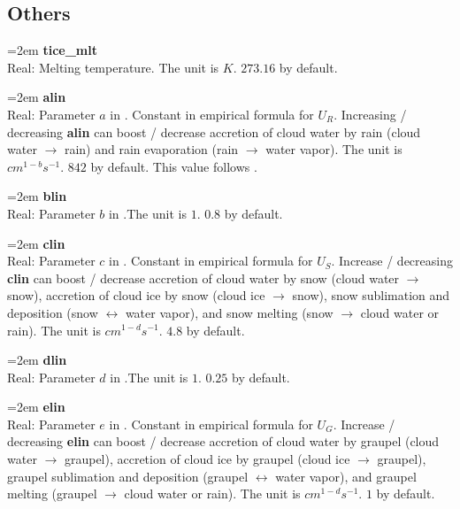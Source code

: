 \documentclass[letterpaper,titlepage,10pt]{article}
\numberwithin{equation}{section}
\begin{document}
\begin{appendices}

\subsection{Others}

\hangindent=2em
\textbf{tice\_mlt}\\ Real: Melting temperature. The unit is $K$. $273.16$ by default.

\hangindent=2em
\textbf{alin}\\ Real: Parameter $a$ in \citet{lin1983bulk}. Constant in empirical formula for $U_R$. Increasing / decreasing \textbf{alin} can boost / decrease accretion of cloud water by rain (cloud water $\rightarrow$ rain) and rain evaporation (rain $\rightarrow$ water vapor). The unit is $cm^{1-b} s^{-1}$. $842$ by default. This value follows \citet{hong2006thew}.

\hangindent=2em
\textbf{blin}\\ Real: Parameter $b$ in \citet{lin1983bulk}.The unit is $1$. $0.8$ by default.

\hangindent=2em
\textbf{clin}\\ Real: Parameter $c$ in \citet{lin1983bulk}. Constant in empirical formula for $U_S$. Increase / decreasing \textbf{clin} can boost / decrease accretion of cloud water by snow (cloud water $\rightarrow$ snow), accretion of cloud ice by snow (cloud ice $\rightarrow$ snow), snow sublimation and deposition (snow $\leftrightarrow$ water vapor), and snow melting (snow $\rightarrow$ cloud water or rain). The unit is $cm^{1-d} s^{-1}$. $4.8$ by default.

\hangindent=2em
\textbf{dlin}\\ Real: Parameter $d$ in \citet{lin1983bulk}.The unit is $1$. $0.25$ by default.

\hangindent=2em
\textbf{elin}\\ Real: Parameter $e$ in \citet{lin1983bulk}. Constant in empirical formula for $U_G$. Increase / decreasing \textbf{elin} can boost / decrease accretion of cloud water by graupel (cloud water $\rightarrow$ graupel), accretion of cloud ice by graupel (cloud ice $\rightarrow$ graupel), graupel sublimation and deposition (graupel $\leftrightarrow$ water vapor), and graupel melting (graupel $\rightarrow$ cloud water or rain). The unit is $cm^{1-d} s^{-1}$. $1$ by default.


\end{appendices}
\end{document}
